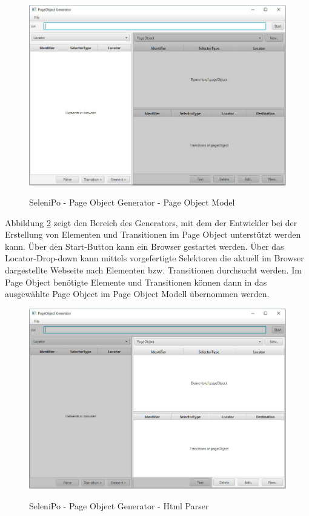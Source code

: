 \begin{figure}[htb]
  \centering  
  \includegraphics[scale=0.5]{img/poGeneratorPo.JPG}\\
  \caption{SeleniPo - Page Object Generator - Page Object Model}
  \label{fig:poGeneratorPo}
\end{figure}

\newpage

Abbildung \ref{fig:poGeneratorHtml} zeigt den Bereich des Generators, mit dem der Entwickler bei der Erstellung von Elementen und Transitionen im Page Object unterstützt werden kann.
Über den Start-Button kann ein Browser gestartet werden. Über das Locator-Drop-down kann mittels vorgefertigte Selektoren die aktuell im Browser dargestellte Webseite nach Elementen bzw. Transitionen durchsucht werden. Im Page Object benötigte Elemente und Transitionen können dann in das ausgewählte Page Object im Page Object Modell übernommen werden.

\begin{figure}[htb]
  \centering  
  \includegraphics[scale=0.5]{img/poGeneratorHtml.JPG}\\
  \caption{SeleniPo - Page Object Generator - Html Parser}
  \label{fig:poGeneratorHtml}
\end{figure}

